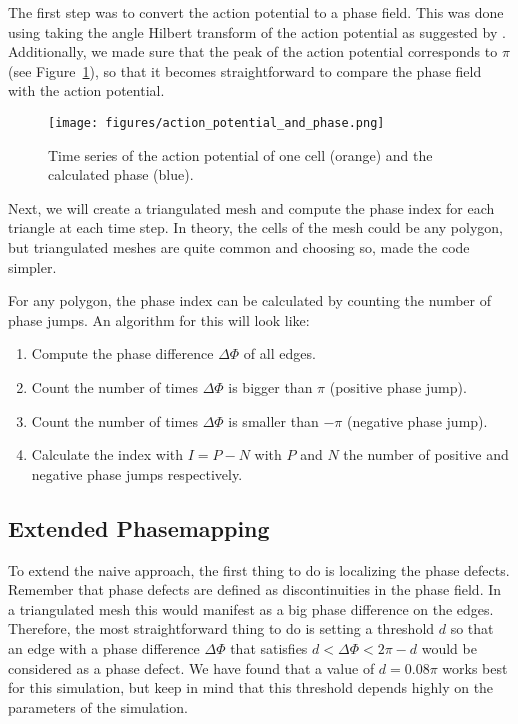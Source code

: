 \documentclass[twocolumn]{article}
\begin{document}
The first step was to convert the action potential to a phase field.
This was done using taking the angle Hilbert transform of the action
potential as suggested by \autocite{bray2002considerations}. Additionally,
we made sure that the peak of the action potential corresponds to
\(\pi\) (see Figure~\ref{fig:action_potential_and_phase}),
so that it becomes straightforward to compare the phase field with
the action potential.

\begin{figure}[ht]
  \begin{center}
    \texttt{[image: figures/action\_potential\_and\_phase.png]}
  \end{center}
  \caption{
    Time series of the action potential of one cell (orange)
    and the calculated phase (blue).
  }\label{fig:action_potential_and_phase}
\end{figure}

Next, we will create a triangulated mesh and compute the phase index for
each triangle at each time step. In theory, the cells of the mesh could
be any polygon, but triangulated meshes are quite common and choosing
so, made the code simpler.

For any polygon, the phase index can be calculated by counting the
number of phase jumps. An algorithm for this will look like:

\begin{enumerate}
    \def\labelenumi{\arabic{enumi}.}
    \tightlist
  \item
    Compute the phase difference \(\Delta\Phi\) of all edges.
  \item
    Count the number of times \(\Delta\Phi\) is bigger than \(\pi\)
    (positive phase jump).
  \item
    Count the number of times \(\Delta\Phi\) is smaller than \(-\pi\)
    (negative phase jump).
  \item
    Calculate the index with \(I = P - N\) with \(P\) and \(N\) the number
    of positive and negative phase jumps respectively.
\end{enumerate}

\subsection{Extended Phasemapping}\label{extended-phasemapping}

To extend the naive approach, the first thing to do is localizing the
phase defects. Remember that phase defects are defined as
discontinuities in the phase field. In a triangulated mesh this would
manifest as a big phase difference on the edges. Therefore, the most
straightforward thing to do is setting a threshold \(d\) so that an edge
with a phase difference \(\Delta\Phi\) that satisfies
\(d<\Delta\Phi<2\pi-d\) would be considered as a phase defect. We have
found that a value of \(d=0.08\pi\) works best for this simulation, but
keep in mind that this threshold depends highly on the parameters of the
simulation.
\end{document}
